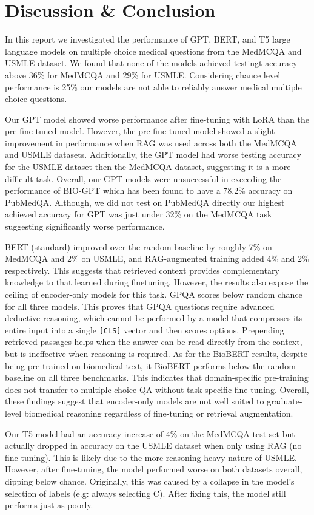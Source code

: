 \documentclass{article}
\begin{document}
\section{Discussion \& Conclusion}
In this report we investigated the performance of GPT, BERT, and T5 large language models on multiple choice medical questions from the MedMCQA and USMLE dataset. We found that none of the models achieved testingt accuracy above 36\% for MedMCQA and 29\% for USMLE. Considering chance level performance is 25\% our models are not able to reliably answer medical multiple choice questions. 

Our GPT model showed worse performance after fine-tuning with LoRA than the pre-fine-tuned model. However, the pre-fine-tuned model showed a slight improvement in performance when RAG was used across both the MedMCQA and USMLE datasets. Additionally, the GPT model had worse testing accuracy for the USMLE dataset then the MedMCQA dataset, suggesting it is a more difficult task. Overall, our GPT models were unsuccessful in exceeding the performance of BIO-GPT which has been found to have a 78.2\% accuracy on PubMedQA. Although, we did not test on PubMedQA directly our highest achieved accuracy for GPT was just under 32\% on the MedMCQA task suggesting significantly worse performance\cite{Luo_2022}.

BERT (standard) improved over the random baseline by roughly 7\% on MedMCQA and 2\% on USMLE, and RAG-augmented training added 4\% and 2\% respectively. This suggests that retrieved context provides complementary knowledge to that learned during finetuning.
However, the results also expose the ceiling of encoder-only models for this task. GPQA scores below random chance for all three models. This proves that GPQA questions require advanced deductive reasoning, which cannot be performed by a model that compresses its entire input into a single \texttt{[CLS]} vector and then scores options. Prepending retrieved passages helps when the answer can be read directly from the context, but is ineffective when reasoning is required.
As for the BioBERT results, despite being pre-trained on biomedical text, it BioBERT performs below the random baseline on all three benchmarks. This indicates that domain-specific pre-training does not transfer to multiple-choice QA without task-specific fine-tuning.
Overall, these findings suggest that encoder-only models are not well suited to graduate-level biomedical reasoning regardless of fine-tuning or retrieval
augmentation.


Our T5 model had an accuracy increase of $4\%$ on the MedMCQA test set but actually dropped in accuracy on the USMLE dataset when only using RAG (no fine-tuning). This is likely due to the more reasoning-heavy nature of USMLE. However, after fine-tuning, the model performed worse on both datasets overall, dipping below chance. Originally, this was caused by a collapse in the model's selection of labels (e.g: always selecting C). After fixing this, the model still performs just as poorly.
\end{document}
